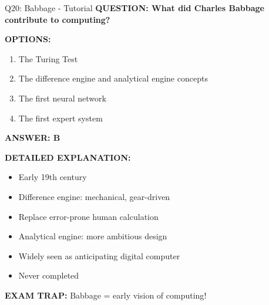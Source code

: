 \documentclass[8pt]{beamer}
\begin{document}
	\begin{frame}{Q20: Babbage - Tutorial}
		\fontsize{6.5}{7.5}\selectfont
		\textbf{QUESTION: What did Charles Babbage contribute to computing?}
		
		\vspace{0.1cm}
		\textbf{OPTIONS:}
		\begin{enumerate}
			\item The Turing Test
			\item The difference engine and analytical engine concepts
			\item The first neural network
			\item The first expert system
		\end{enumerate}
		
		\vspace{0.1cm}
		\textcolor{myblue}{\textbf{ANSWER: B}}
		
		\vspace{0.1cm}
		\textbf{DETAILED EXPLANATION:}
		\begin{itemize}
			\item Early 19th century
			\item Difference engine: mechanical, gear-driven
			\item Replace error-prone human calculation
			\item Analytical engine: more ambitious design
			\item Widely seen as anticipating digital computer
			\item Never completed
		\end{itemize}
		
		\vspace{0.1cm}
		\textcolor{myred}{\textbf{EXAM TRAP:}} Babbage = \textcolor{myblue}{early vision of computing}!
	\end{frame}
	
\end{document}
